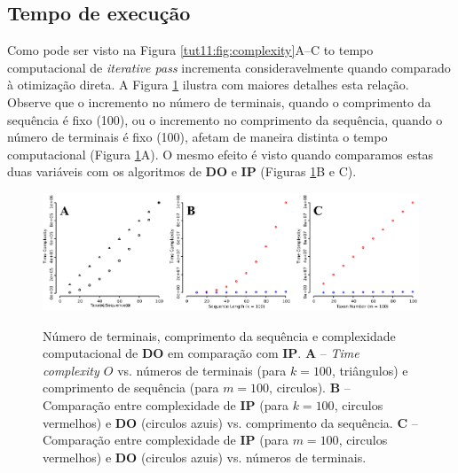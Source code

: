 \begin{refsection}
\subsection{Tempo de execução}\label{tut11:ip:time}

Como pode ser visto na Figura \ref{tut11:fig:complexity}A--C to tempo computacional de \textit{iterative pass} incrementa consideravelmente quando comparado à otimização direta. A Figura \ref{tut11:fig:complexity2} ilustra com maiores detalhes esta relação. Observe que o incremento no número de terminais, quando o comprimento da sequência é fixo (100), ou o incremento no comprimento da sequência, quando o número de terminais é fixo (100), afetam de maneira distinta o tempo computacional (Figura \ref{tut11:fig:complexity2}A). O mesmo efeito é visto quando comparamos estas duas variáveis com os algoritmos de \textbf{DO} e \textbf{IP} (Figuras \ref{tut11:fig:complexity2}B e C).

  \begin{figure}[H]
      {\includegraphics[scale=0.9]{figures/tut11/complexity_2.eps}}
	{\caption[Número de terminais, comprimento da sequência e complexidade computacional de \textbf{DO} em comparação com \textbf{IP}.]{Número de terminais, comprimento da sequência e complexidade computacional de \textbf{DO} em comparação com \textbf{IP}. \textbf{A} --  \textit{Time complexity $O$} vs. números de terminais (para $k=100$, triângulos) e comprimento de sequência (para $m=100$, circulos). \textbf{B} -- Comparação entre complexidade de \textbf{IP} (para $k=100$, circulos vermelhos) e \textbf{DO} (circulos azuis) vs. comprimento da sequência. \textbf{C} -- Comparação entre complexidade de \textbf{IP} (para $m=100$, circulos vermelhos) e \textbf{DO} (circulos azuis) vs. números de terminais.}\label{tut11:fig:complexity2}}
  \end{figure}



\end{refsection}

